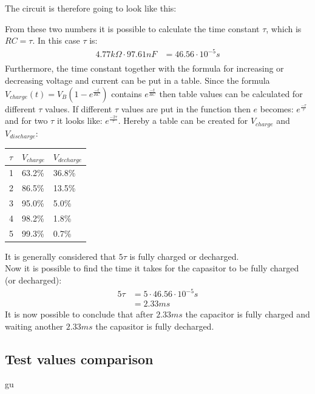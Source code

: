 The circuit is therefore going to look like this:
\begin{figure}[H]

\end{figure}
From these two numbers it is possible to calculate the time constant $\tau$, which is $RC = \tau$. In this case $\tau$ is:
\begin{align*}
4.77 k\Omega \cdot 97.61 nF &= 46.56 \cdot 10^{-5} s \\
\end{align*}
Furthermore, the time constant together with the formula for increasing or decreasing voltage and current can be put in a table. Since the formula $V_{charge}(t)=V_B(1-e^{\frac{-t}{RC}})$ contains $e^{\frac{-t}{RC}}$ then table values can be calculated for different $\tau$ values. If different $\tau$ values are put in the function then $e$ becomes: $e^{\frac{-\tau}{\tau}}$ and for two $\tau$ it looks like: $e^{\frac{-2\tau}{\tau}}$. Hereby a table can be created for $V_{charge}$ and $V_{discharge}$:
\begin{table}[H]
\begin{tabular}{|l|l|l|}
\hline
$\tau$ & $V_{charge}$ & $V_{decharge}$ \\ \hline
1      & 63.2\%       & 36.8\%         \\ \hline
2      & 86.5\%       & 13.5\%         \\ \hline
3      & 95.0\%       & 5.0\%          \\ \hline
4      & 98.2\%       & 1.8\%          \\ \hline
5      & 99.3\%       & 0.7\%          \\ \hline
\end{tabular}
\end{table}
It is generally considered that $5\tau$ is fully charged or decharged. \\
Now it is possible to find the time it takes for the capasitor to be fully charged (or decharged):
\begin{align*}
5\tau &= 5 \cdot 46.56 \cdot 10^{-5} s \\
&= 2.33 ms
\end{align*}
It is now possible to conclude that after $2.33 ms$ the capacitor is fully charged and waiting another $2.33 ms$ the capasitor is fully decharged. 
\subsection{Test values comparison}
gu

